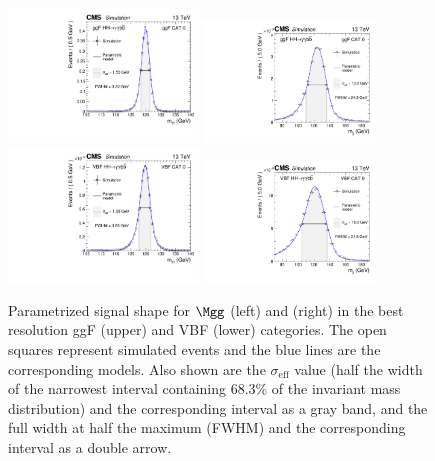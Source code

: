 \documentclass[11pt,a4paper,cmspaper,final,collab]{cms-tdr}
\begin{document}
\begin{figure} [hbtp]
	\centering
		{\includegraphics[width=0.45\textwidth]{Figure_007-a.pdf}}
		{\includegraphics[width=0.41\textwidth]{Figure_007-b.pdf}}\\
		{\includegraphics[width=0.45\textwidth]{Figure_007-c.pdf}}
		{\includegraphics[width=0.41\textwidth]{Figure_007-d.pdf}}
  \caption{Parametrized signal shape for $\Mgg$ (left) and \Mjj (right) in the best resolution ggF (upper) and VBF (lower) categories. The open
  squares represent simulated events and the blue lines are the
  corresponding models. Also shown are the $\sigma_{\text{eff}}$ value
  (half the width of the narrowest interval containing 68.3\% of the
  invariant mass distribution) and the corresponding interval as a gray
  band, and the full width at half the maximum (FWHM) and the corresponding
  interval as a double arrow.}
		\label{fig:statAnalysisSigPlots}
\end{figure}
\end{document}
